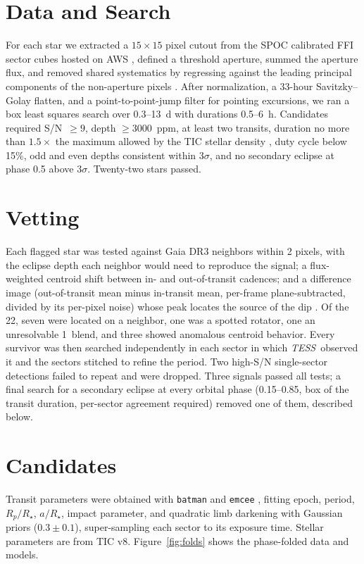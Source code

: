 \documentclass[RNAAS]{aastex631}
\newcommand{\tess}{\textit{TESS}}
\begin{document}
\section{Data and Search}
For each star we extracted a $15\times15$ pixel cutout from the SPOC calibrated FFI sector cubes hosted on AWS \citep[astrocut;][]{brasseur2019}, defined a threshold aperture, summed the aperture flux, and removed shared systematics by regressing against the leading principal components of the non-aperture pixels \citep[lightkurve;][]{lightkurve2018}. After normalization, a 33-hour Savitzky--Golay flatten, and a point-to-point-jump filter for pointing excursions, we ran a box least squares search \citep{kovacs2002} over 0.3--13~d with durations 0.5--6~h. Candidates required S/N~$\geq9$, depth $\geq3000$~ppm, at least two transits, duration no more than $1.5\times$ the maximum allowed by the TIC stellar density \citep{stassun2019}, duty cycle below 15\%, odd and even depths consistent within $3\sigma$, and no secondary eclipse at phase 0.5 above $3\sigma$. Twenty-two stars passed.

\section{Vetting}
Each flagged star was tested against Gaia DR3 \citep{gaia2023} neighbors within 2 pixels, with the eclipse depth each neighbor would need to reproduce the signal; a flux-weighted centroid shift between in- and out-of-transit cadences; and a difference image (out-of-transit mean minus in-transit mean, per-frame plane-subtracted, divided by its per-pixel noise) whose peak locates the source of the dip \citep{bryson2013,twicken2018}. Of the 22, seven were located on a neighbor, one was a spotted rotator, one an unresolvable 1\arcsec\ blend, and three showed anomalous centroid behavior. Every survivor was then searched independently in each sector in which \tess\ observed it \citep[sectors from tess-point;][]{burke2020} and the sectors stitched to refine the period. Two high-S/N single-sector detections failed to repeat and were dropped. Three signals passed all tests; a final search for a secondary eclipse at every orbital phase (0.15--0.85, box of the transit duration, per-sector agreement required) removed one of them, described below.

\section{Candidates}
Transit parameters were obtained with \texttt{batman} \citep{kreidberg2015} and \texttt{emcee} \citep{foremanmackey2013}, fitting epoch, period, $R_p/R_\star$, $a/R_\star$, impact parameter, and quadratic limb darkening with Gaussian priors ($0.3\pm0.1$), super-sampling each sector to its exposure time. Stellar parameters are from TIC v8. Figure~\ref{fig:folds} shows the phase-folded data and models.
\end{document}
